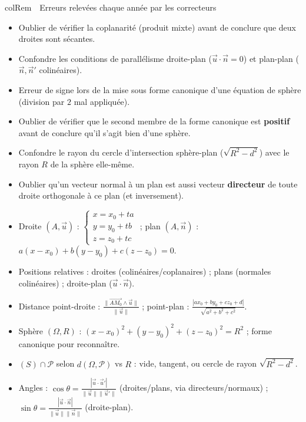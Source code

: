 \documentclass[11pt,a4paper]{article}
\newenvironment{remarque}[1][Remarque]
  {\begin{fiche}{colRem}{\ding{43}~~#1}}{\end{fiche}}
\begin{document}
\begin{remarque}[Erreurs relevées chaque année par les correcteurs]
\begin{itemize}[leftmargin=6mm, itemsep=0.5mm]
  \item Oublier de vérifier la coplanarité (produit mixte) avant de conclure que deux droites sont sécantes.
  \item Confondre les conditions de parallélisme droite-plan ($\vec u\cdot\vec n=0$) et plan-plan ($\vec n,\vec n'$ colinéaires).
  \item Erreur de signe lors de la mise sous forme canonique d'une équation de sphère (division par $2$ mal appliquée).
  \item Oublier de vérifier que le second membre de la forme canonique est \textbf{positif} avant de conclure qu'il s'agit bien d'une sphère.
  \item Confondre le rayon du cercle d'intersection sphère-plan ($\sqrt{R^2-d^2}$) avec le rayon $R$ de la sphère elle-même.
  \item Oublier qu'un vecteur normal à un plan est aussi vecteur \textbf{directeur} de toute droite orthogonale à ce plan (et inversement).
\end{itemize}
\end{remarque}

\vspace{4mm}
\begin{tcolorbox}[
  enhanced, boxrule=0pt, arc=2mm,
  interior style={left color=qtealdark, right color=qteal},
  left=6mm, right=6mm, top=4mm, bottom=4mm,
  fontupper=\color{white}\sffamily,
  title={\sffamily\bfseries\color{white}\ding{72}~~À retenir},
  colbacktitle=qtealdark, coltitle=white, boxrule=0pt
]
\begin{itemize}[leftmargin=6mm, label={\color{qamber}}, itemsep=1mm]
  \item Droite $(A,\vec u)$ : $\begin{cases}x=x_0+ta\\y=y_0+tb\\z=z_0+tc\end{cases}$ ; plan $(A,\vec n)$ : $a(x-x_0)+b(y-y_0)+c(z-z_0)=0$.
  \item Positions relatives : droites (colinéaires/coplanaires) ; plans (normales colinéaires) ; droite-plan ($\vec u\cdot\vec n$).
  \item Distance point-droite : $\frac{\|\overrightarrow{AM_0}\wedge\vec u\|}{\|\vec u\|}$ ; point-plan : $\frac{|ax_0+by_0+cz_0+d|}{\sqrt{a^2+b^2+c^2}}$.
  \item Sphère $(\Omega,R)$ : $(x-x_0)^2+(y-y_0)^2+(z-z_0)^2=R^2$ ; forme canonique pour reconnaître.
  \item $(S)\cap\mathcal{P}$ selon $d(\Omega,\mathcal{P})$ vs $R$ : vide, tangent, ou cercle de rayon $\sqrt{R^2-d^2}$.
  \item Angles : $\cos\theta=\frac{|\vec u\cdot\vec u'|}{\|\vec u\|\|\vec u'\|}$ (droites/plans, via directeurs/normaux) ; $\sin\theta=\frac{|\vec u\cdot\vec n|}{\|\vec u\|\|\vec n\|}$ (droite-plan).
\end{itemize}
\end{tcolorbox}
\end{document}

